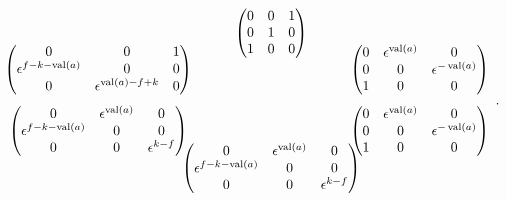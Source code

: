 \documentclass{amsart}
\theoremstyle{definition}
\def\e{\epsilon}
\def\val{\mathop{\mathrm{val}}}
\def\heximages#1#2#3#4#5#6{
  \heximagessqueezedcarefully{1.7em}{-1em}{#1}{#2}{#3}{#4}{#5}{#6}
}
\def\heximagessqueezedcarefully#1#2#3#4#5#6#7#8{
  \begin{array}{ccc}
    & #3 & \\[#2]
    #5 \hspace{-#1} & & \hspace{-#1} #4 \\[2em]
    #6 \hspace{-#1} & & \hspace{-#1} #7 \\[#2]
    & #8 &
  \end{array}
}
\begin{document}
  \begin{equation*}
    \heximages
    	{\begin{pmatrix}
	    0 & 0 & 1 \\
	    0 & 1 & 0 \\
	    1 & 0 & 0 
	\end{pmatrix}}
	{\begin{pmatrix}
	    0 & \e^{\val(a)} & 0 \\
	    0 & 0 & \e^{-\val(a)}  \\
	    1 & 0 & 0
	\end{pmatrix}}
	{\begin{pmatrix}
	    0 & 0 & 1 \\
	    \e^{f - k - \val(a)}  & 0 & 0 \\
	    0 & \e^{\val(a) - f + k}  & 0
	\end{pmatrix}}
	{\begin{pmatrix}
	    0 & \e^{\val(a)} & 0 \\
	    \e^{f-k-\val(a)} & 0 & 0 \\
	    0 & 0 & \e^{k-f} 
	\end{pmatrix}}
	{\begin{pmatrix}
	    0 & \e^{\val(a)} & 0 \\
	    0 & 0 & \e^{-\val(a)}  \\
	    1 & 0 & 0
	\end{pmatrix}}
	{\begin{pmatrix}
	    0 & \e^{\val(a)} & 0 \\
	    \e^{f-k-\val(a)} & 0 & 0 \\
	    0 & 0 & \e^{k-f} 
	\end{pmatrix}}.
  \end{equation*}
\end{document}
